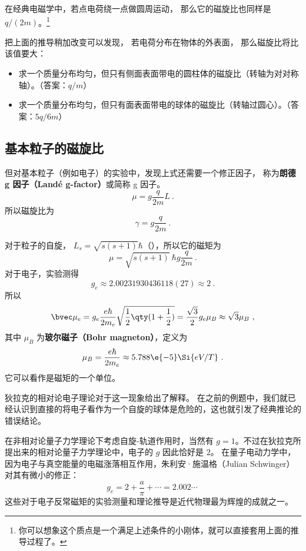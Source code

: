 在经典电磁学中，若点电荷绕一点做圆周运动， 那么它的磁旋比也同样是 $q/(2m)$。\footnote{你可以想象这个质点是一个满足上述条件的小刚体，就可以直接套用上面的推导过程了。}

把上面的推导稍加改变可以发现， 若电荷分布在物体的外表面， 那么磁旋比将比该值要大：
\begin{exercise}{}
\begin{itemize}
\item 求一个质量分布均匀，但只有侧面表面带电的圆柱体的磁旋比（转轴为对对称轴）。（答案：$q/m$）
\item 求一个质量分布均匀，但只有面表面带电的球体的磁旋比（转轴过圆心）。（答案：$5q/6m$）
\end{itemize}
\end{exercise}

\subsection{基本粒子的磁旋比}
但对基本粒子（例如电子）的实验中，发现上式还需要一个修正因子， 称为\textbf{朗德 g 因子（Landé g-factor）}或简称 g 因子。
\begin{equation}\label{eq_BohMag_4}
\mu  = g\frac{q}{2m} L~.
\end{equation}
所以磁旋比为
\begin{equation}
\gamma  = g\frac{q}{2m}~.
\end{equation}

对于粒子的自旋， $L_s = \sqrt{s(s + 1)}\hbar$（），所以它的磁矩为
\begin{equation}
\mu = \sqrt{s (s + 1)}\ \hbar g\frac{q}{2m}~.
\end{equation}
对于电子，实验测得
\begin{equation}
g_e \approx 2.00231930436118(27) \approx 2~.
\end{equation}
所以
\begin{equation}
\bvec \mu_e  = g_e \frac{e\hbar}{2 m_e} \sqrt{\frac12 \qty(1 + \frac12)}  = \frac{\sqrt 3}{2} g_e \mu_B \approx \sqrt 3 \mu_B~,
\end{equation}
其中 $\mu_B$ 为\textbf{玻尔磁子（Bohr magneton）}，定义为
\begin{equation}
\mu_B = \frac{e\hbar}{2 m_e} \approx 5.788\e{-5} \Si{eV/T}~.
\end{equation}
它可以看作是磁矩的一个单位。

狄拉克的相对论电子理论对于这一现象给出了解释。
在之前的例题中，我们就已经认识到直接的将电子看作为一个自旋的球体是危险的，这也就引发了经典推论的错误结论。

在非相对论量子力学理论下考虑自旋-轨道作用时，当然有 $g=1$。不过在狄拉克所提出来的相对论量子力学理论中，电子的 $g$ 因此恰好是 $2$。 在量子电动力学中，因为电子与真空能量的电磁涨落相互作用，朱利安·施温格（Julian Schwinger）对其有微小的修正：
\begin{equation}
g_e = 2+\frac{a}{\pi}+\cdots = 2.002\cdots~
\end{equation}
这些对于电子反常磁矩的实验测量和理论推导是近代物理最为辉煌的成就之一。
